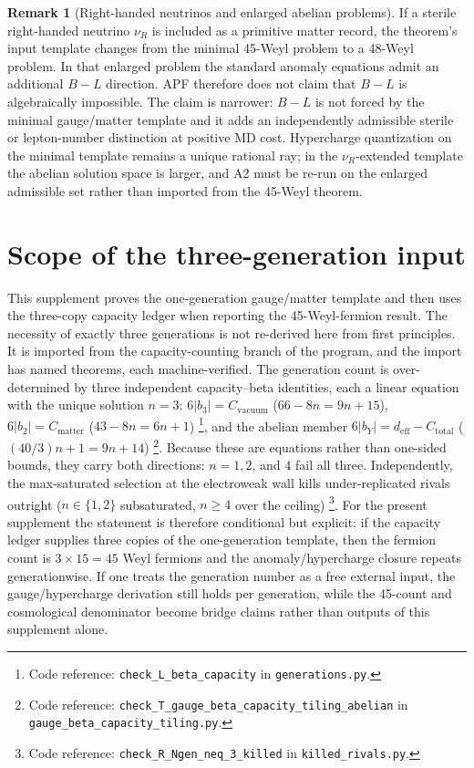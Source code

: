 \documentclass[11pt]{article}
\theoremstyle{definition}
\newtheorem{remark}[theorem]{Remark}
\newcommand{\coderef}[2]{\footnote{Code reference: \texttt{#1} in \texttt{#2}.}}
\begin{document}
\begin{remark}[Right-handed neutrinos and enlarged abelian problems]
\label{rem:nuR_extended_v35}
If a sterile right-handed neutrino $\nu_R$ is included as a primitive matter record, the theorem's input template changes from the minimal 45-Weyl problem to a 48-Weyl problem.  In that enlarged problem the standard anomaly equations admit an additional $B-L$ direction.  APF therefore does not claim that $B-L$ is algebraically impossible.  The claim is narrower: $B-L$ is not forced by the minimal gauge/matter template and it adds an independently admissible sterile or lepton-number distinction at positive MD cost.  Hypercharge quantization on the minimal template remains a unique rational ray; in the $\nu_R$-extended template the abelian solution space is larger, and A2 must be re-run on the enlarged admissible set rather than imported from the 45-Weyl theorem.
\end{remark}


\newpage

\section{Scope of the three-generation input}
\label{sec:three_generation_scope}

This supplement proves the one-generation gauge/matter template and then
uses the three-copy capacity ledger when reporting the 45-Weyl-fermion result.
The necessity of exactly three generations is not re-derived here from first
principles.  It is imported from the capacity-counting branch of the program,
and the import has named theorems, each machine-verified.  The generation
count is over-determined by three independent capacity--beta identities, each
a linear equation with the unique solution $n = 3$: $6|b_3| = C_{\mathrm{vacuum}}$
($66 - 8n = 9n + 15$), $6|b_2| = C_{\mathrm{matter}}$ ($43 - 8n = 6n + 1$)
\coderef{check\_L\_beta\_capacity}{generations.py}, and the abelian member
$6|b_Y| = d_{\mathrm{eff}} - C_{\mathrm{total}}$ ($(40/3)n + 1 = 9n + 14$)
\coderef{check\_T\_gauge\_beta\_capacity\_tiling\_abelian}{gauge\_beta\_capacity\_tiling.py}.
Because these are equations rather than one-sided bounds, they carry both
directions: $n = 1, 2$, and $4$ fail all three.  Independently, the
max-saturated selection at the electroweak wall kills under-replicated rivals
outright ($n \in \{1,2\}$ subsaturated, $n \ge 4$ over the ceiling)
\coderef{check\_R\_Ngen\_neq\_3\_killed}{killed\_rivals.py}.
For the present supplement the statement is therefore conditional but explicit:
if the capacity ledger supplies three copies of the one-generation template,
then the fermion count is $3\times15=45$ Weyl fermions and the anomaly/hypercharge
closure repeats generationwise.  If one treats the generation number as a free
external input, the gauge/hypercharge derivation still holds per generation,
while the 45-count and cosmological denominator become bridge claims rather
than outputs of this supplement alone.
\end{document}
